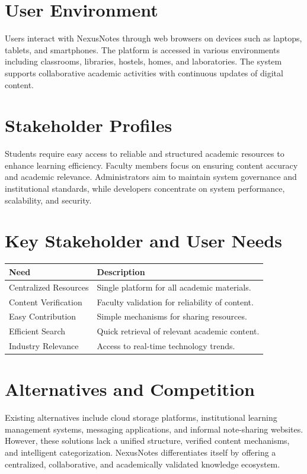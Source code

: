 \documentclass[12pt,a4paper]{report}
\begin{document}
\section{User Environment}
Users interact with NexusNotes through web browsers on devices such as laptops, tablets, and smartphones. The platform is accessed in various environments including classrooms, libraries, hostels, homes, and laboratories. The system supports collaborative academic activities with continuous updates of digital content.

\section{Stakeholder Profiles}
Students require easy access to reliable and structured academic resources to enhance learning efficiency. Faculty members focus on ensuring content accuracy and academic relevance. Administrators aim to maintain system governance and institutional standards, while developers concentrate on system performance, scalability, and security.

\section{Key Stakeholder and User Needs}

\begin{center}
\begin{tabular}{|l|p{8cm}|}
\hline
Need & Description \\
\hline
Centralized Resources & Single platform for all academic materials. \\
\hline
Content Verification & Faculty validation for reliability of content. \\
\hline
Easy Contribution & Simple mechanisms for sharing resources. \\
\hline
Efficient Search & Quick retrieval of relevant academic content. \\
\hline
Industry Relevance & Access to real-time technology trends. \\
\hline
\end{tabular}
\end{center}

\section{Alternatives and Competition}
Existing alternatives include cloud storage platforms, institutional learning management systems, messaging applications, and informal note-sharing websites. However, these solutions lack a unified structure, verified content mechanisms, and intelligent categorization. NexusNotes differentiates itself by offering a centralized, collaborative, and academically validated knowledge ecosystem.
\end{document}
